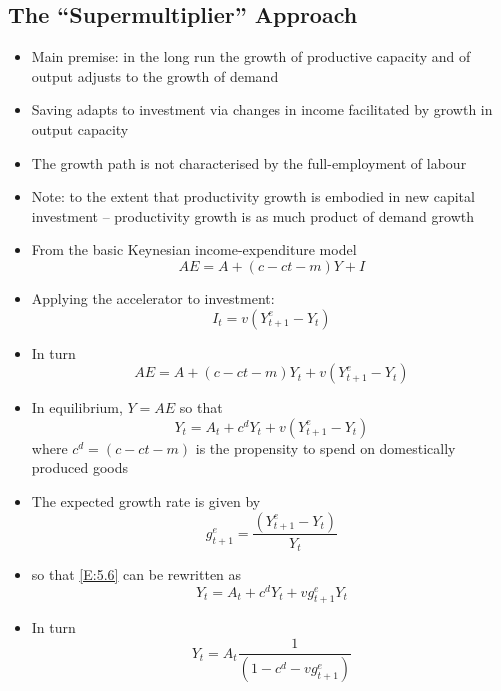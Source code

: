 \documentclass[a4paper,twoside]{article}
\numberwithin{equation}{section}
\numberwithin{figure}{section}
\begin{document}
\subsection{The ``Supermultiplier'' Approach}
	\begin{itemize}
		\item Main premise: in the long run the growth of productive capacity and of output adjusts to the growth of demand
		\item Saving adapts to investment via changes in income facilitated by growth in output capacity
		\item The growth path is not characterised by the full-employment of labour
		\item Note: to the extent that productivity growth is embodied in new capital investment -- productivity growth is as much  product of demand growth
		\item From the basic Keynesian income-expenditure model
		\begin{equation}
			AE = A + (c-ct-m)Y + I \label{E:5.3}
		\end{equation}
		\item Applying the accelerator to investment:
		\begin{equation}
			I_t=v(Y_{t+1}^e-Y_t) \label{E:5.4}
		\end{equation}
		\item In turn
		\begin{equation}
			AE = A + (c-ct-m)Y_t + v(Y_{t+1}^e-Y_t) \label{E:5.5}
		\end{equation}
		\item In equilibrium, \( Y=AE \) so that
		\begin{equation}
			Y_t = A_t + c^dY_t+v\left( Y_{t+1}^e-Y_t \right) \label{E:5.6}
		\end{equation}
		where \( c^d = (c-ct-m) \) is the propensity to spend on domestically produced goods
		\item The expected growth rate is given by
		\begin{equation}
			g_{t+1}^e = \frac{\left( Y_{t+1}^e-Y_t \right)}{Y_t} \label{E:5.7}
		\end{equation}
		\item so that \cref{E:5.6} can be rewritten as
		\begin{equation}
			Y_t = A_t + c^dY_t+vg_{t+1}^eY_t \label{E:5.8}
		\end{equation}
		\item In turn
		\begin{equation}
			Y_t = A_t \frac{1}{\left( 1-c^d-vg_{t+1}^e \right)} \label{E:5.9}

\end{equation}
\end{itemize}
\end{document}
